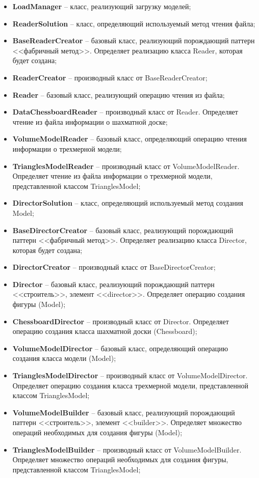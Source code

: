 \begin{itemize}
	\item \textbf{LoadManager} -- класс, реализующий загрузку моделей;
	\item \textbf{ReaderSolution} -- класс, определяющий используемый метод чтения файла;
	\item \textbf{BaseReaderCreator} -- базовый класс, реализующий порождающий паттерн <<фабричный метод>>. Определяет реализацию класса Reader, которая будет создана;
	\item \textbf{ReaderCreator} -- производный класс от BaseReaderCreator;
	\item \textbf{Reader} -- базовый класс, реализующий операцию чтения из файла;
	\item \textbf{DataChessboardReader} -- производный класс от Reader. Определяет чтение из файла информации о шахматной доске;
	\item \textbf{VolumeModelReader} -- базовый класс, определяющий операцию чтения информации о трехмерной модели;
	\item \textbf{TrianglesModelReader} -- производный класс от VolumeModelReader. Определяет чтение из файла информации о трехмерной модели, представленной классом TrianglesModel;
	\item \textbf{DirectorSolution} -- класс, определяющий используемый метод создания Model;
	\item \textbf{BaseDirectorCreator} -- базовый класс, реализующий порождающий паттерн <<фабричный метод>>. Определяет реализацию класса Director, которая будет создана;
	\item \textbf{DirectorCreator} -- производный класс от BaseDirectorCreator;
	\item \textbf{Director} -- базовый класс, реализующий порождающий паттерн <<строитель>>, элемент <<director>>. Определяет операцию создания фигуры (Model);
	\item \textbf{ChessboardDirector} -- производный класс от Director. Определяет операцию создания класса шахматной доски (Chessboard);
	\item \textbf{VolumeModelDirector} -- базовый класс, определяющий операцию создания класса модели (Model);
	\item \textbf{TrianglesModelDirector} -- производный класс от VolumeModelDirector. Определяет операцию создания класса трехмерной модели, представленной классом TrianglesModel;
	\item \textbf{VolumeModelBuilder} -- базовый класс, реализующий порождающий паттерн <<строитель>>, элемент <<builder>>. Определяет множество операций необходимых для создания фигуры (Model);
	\item \textbf{TrianglesModelBuilder} -- производный класс от VolumeModelBuilder. Определяет множество операций необходимых для создания фигуры, представленной классом TrianglesModel;	
\end{itemize}

